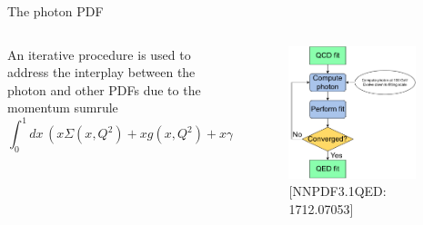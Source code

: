 \documentclass[8pt,t]{beamer}
\begin{document}
\begin{frame}{The photon PDF}
  \begin{columns}[T]
    \begin{column}{0.59\textwidth}
      An iterative procedure  is used to address the interplay between the photon and other PDFs due to the momentum sumrule
      \begin{equation*}
        \int_0^1 dx\, \left(  x\Sigma(x,Q^2) + xg(x,Q^2) + x\gamma(x,Q^2) \right) =1
      \end{equation*}
    \end{column}

    \begin{column}{0.39\textwidth}
      \vspace*{-1.5em}
      \begin{figure}
        \includegraphics[width=0.9\textwidth]{figures/luxqed_iteration.pdf}
        \caption*{\color{gray}\small [NNPDF3.1QED: 1712.07053]}
      \end{figure}
    \end{column}
  \end{columns}

\end{frame}
\end{document}

